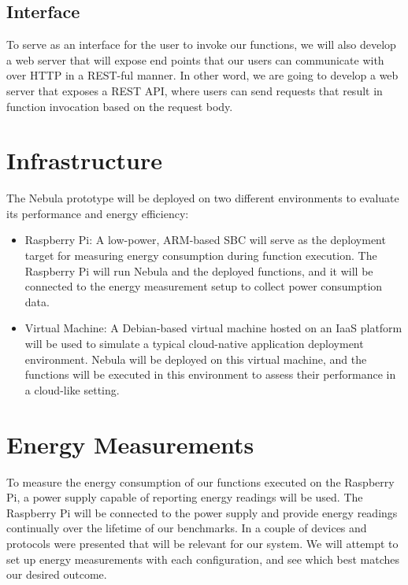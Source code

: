 \documentclass[
  table]{report}
\begin{document}
\subsection{Interface}

To serve as an interface for the user to invoke our functions, we will
also develop a web server that will expose end points that our users can
communicate with over HTTP in a REST-ful manner. In other word, we are
going to develop a web server that exposes a REST API, where users can
send requests that result in function invocation based on the request
body.

\section{Infrastructure}

The Nebula prototype will be deployed on two different environments to
evaluate its performance and energy efficiency:

\begin{itemize}
\item
  Raspberry Pi: A low-power, ARM-based \ac{SBC} will serve as the
  deployment target for measuring energy consumption during function
  execution. The Raspberry Pi will run Nebula and the deployed
  functions, and it will be connected to the energy measurement setup to
  collect power consumption data.
\item
  Virtual Machine: A Debian-based virtual machine hosted on an \ac{IaaS}
  platform will be used to simulate a typical cloud-native application
  deployment environment. Nebula will be deployed on this virtual
  machine, and the functions will be executed in this environment to
  assess their performance in a cloud-like setting.
\end{itemize}

\section{Energy Measurements}

To measure the energy consumption of our functions executed on the
Raspberry Pi, a power supply capable of reporting energy readings will
be used. The Raspberry Pi will be connected to the power supply and
provide energy readings continually over the lifetime of our benchmarks.
In  a couple of devices and protocols were
presented that will be relevant for our system. We will attempt to set
up energy measurements with each configuration, and see which best
matches our desired outcome.
\end{document}

